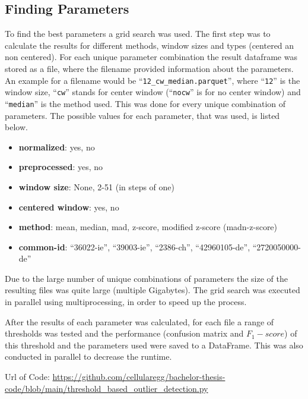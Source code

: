 \subsection{Finding Parameters}
To find the best parameters a grid search was used. The first step was to calculate the results for different methods, window sizes and types (centered an non centered). For each unique parameter combination the result dataframe was stored as a file, where the filename provided information about the parameters. An example for a filename would be ``\verb|12_cw_median.parquet|'', where ``\verb|12|'' is the window size, ``\verb|cw|'' stands for center window (``\verb|nocw|'' is for no center window) and ``\verb|median|'' is the method used. This was done for every unique combination of parameters. The possible values for each parameter, that was used, is listed below.
\begin{itemize}
    \item \textbf{normalized}: yes, no
    \item \textbf{preprocessed}: yes, no 
    \item \textbf{window size}: None, 2-51 (in steps of one)
    \item \textbf{centered window}: yes, no
    \item \textbf{method}: mean, median, mad, z-score, modified z-score (madn-z-score)
    \item \textbf{common-id}: ``36022-ie'', ``39003-ie'', ``2386-ch'', ``42960105-de'', ``2720050000-de''
\end{itemize}
Due to the large number of unique combinations of parameters the size of the resulting files was quite large (multiple Gigabytes). The grid search was executed in parallel using multiprocessing, in order to speed up the process.
\par
After the results of each parameter was calculated, for each file a range of thresholds was tested and the performance (confusion matrix and $F_1-score$) of this threshold and the parameters used were saved to a DataFrame. This was also conducted in parallel to decrease the runtime.
\par
Url of Code: \url{https://github.com/cellularegg/bachelor-thesis-code/blob/main/threshold_based_outlier_detection.py} 

